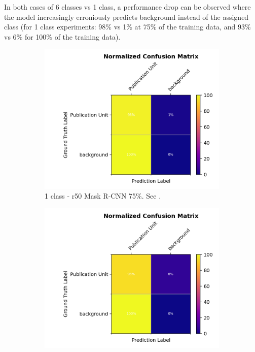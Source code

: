 \documentclass[oneside, english, bibtex]{kththesis}
\begin{document}
In both cases of 6 classes vs 1 class, a performance drop can be observed where the model increasingly erroniously predicts background instead of the assigned class (for 1 class experiments: 98\% vs 1\% at 75\% of the training data, and 93\% vs 6\% for 100\% of the training data).

\begin{figure}[!htb]
\begin{adjustbox}{center,max size={\textwidth}{0.9\textheight}}
\parbox{1.5\textwidth}{\lineskip=0pt
\begin{subfigure}{0.75\textwidth}
  \centering
  \includegraphics[width=\linewidth, clip=true, trim = 0mm 0mm 0mm 0mm]{figures/confusions/vanilla_1c_0.75_inset.png}
  \caption{1 class - r50 Mask R-CNN 75\%. See .}
  \label{fig:vanilla_1c_0.75_inset}
\end{subfigure}%
\begin{subfigure}{0.75\textwidth}
  \centering
  \includegraphics[width=\linewidth, clip=true, trim = 0mm 0mm 0mm 0mm]{figures/confusions/vanilla_1c_1.0_inset.png}

\end{subfigure}}
\end{adjustbox}
\end{figure}
\end{document}
